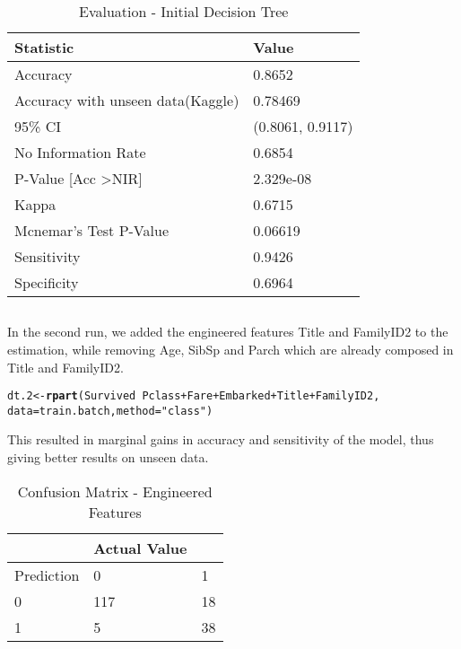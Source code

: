 \documentclass[a4paper,10pt]{report}\usepackage[]{graphicx}\usepackage[]{color}
\makeatletter
\newcommand{\hlstr}[1]{\textcolor[rgb]{0.192,0.494,0.8}{#1}}%
\newcommand{\hlopt}[1]{\textcolor[rgb]{0,0,0}{#1}}%
\newcommand{\hlstd}[1]{\textcolor[rgb]{0.345,0.345,0.345}{#1}}%
\newcommand{\hlkwb}[1]{\textcolor[rgb]{0.69,0.353,0.396}{#1}}%
\newcommand{\hlkwc}[1]{\textcolor[rgb]{0.333,0.667,0.333}{#1}}%
\newcommand{\hlkwd}[1]{\textcolor[rgb]{0.737,0.353,0.396}{\textbf{#1}}}%
\newenvironment{kframe}{%
 \def\at@end@of@kframe{}%
 \ifinner\ifhmode%
  \def\at@end@of@kframe{\end{minipage}}%
  \begin{minipage}{\columnwidth}%
 \fi\fi%
 \def\FrameCommand##1{\hskip\@totalleftmargin \hskip-\fboxsep
 \colorbox{shadecolor}{##1}\hskip-\fboxsep
     \hskip-\linewidth \hskip-\@totalleftmargin \hskip\columnwidth}%
 \MakeFramed {\advance\hsize-\width
   \@totalleftmargin\z@ \linewidth\hsize
   \@setminipage}}%
 {\par\unskip\endMakeFramed%
 \at@end@of@kframe}
\newenvironment{knitrout}{}{} %
\makeatother
\begin{document}
\begin{table}
    \begin{tabular}{|l|l|}
    \hline
    Statistic              & Value           \\ \hline
    Accuracy               & 0.8652          \\
    Accuracy with unseen data(Kaggle)               & 0.78469 \\ 
    95\% CI                & (0.8061, 0.9117) \\
    No Information Rate    & 0.6854          \\
    P-Value [Acc \textgreater NIR]    &  2.329e-08      \\
    Kappa                  &  0.6715         \\
    Mcnemar's Test P-Value & 0.06619          \\
    Sensitivity            &  0.9426         \\
    Specificity            & 0.6964          \\ \hline
    \end{tabular}
    \caption{Evaluation - Initial Decision Tree}
\end{table}

\subsection{}
In the second run, we added the engineered features Title and FamilyID2 to the estimation, while removing Age, SibSp and Parch which are already composed in Title and FamilyID2.
\begin{knitrout}
\color{fgcolor}\begin{kframe}
\begin{alltt}
\hlstd{dt.2} \hlkwb{<-} \hlkwd{rpart}\hlstd{(Survived} \hlopt{~} \hlstd{Pclass} \hlopt{+} \hlstd{Fare} \hlopt{+} \hlstd{Embarked} \hlopt{+} \hlstd{Title} \hlopt{+} \hlstd{FamilyID2,}
    \hlkwc{data} \hlstd{= train.batch,} \hlkwc{method} \hlstd{=} \hlstr{"class"}\hlstd{)}
\end{alltt}
\end{kframe}
\end{knitrout}
This resulted in marginal gains in accuracy and sensitivity of the model, thus giving better results on unseen data.

\begin{table}
    \begin{tabular}{|l|l|l|}
    \hline
    ~          & Actual Value  & ~  \\ \hline
    Prediction & 0             & 1  \\ \hline
    0          & 117           & 18 \\
    1          & 5             & 38 \\ \hline
    \end{tabular}
    \caption{Confusion Matrix - Engineered Features}
\end{table}
\end{document}
